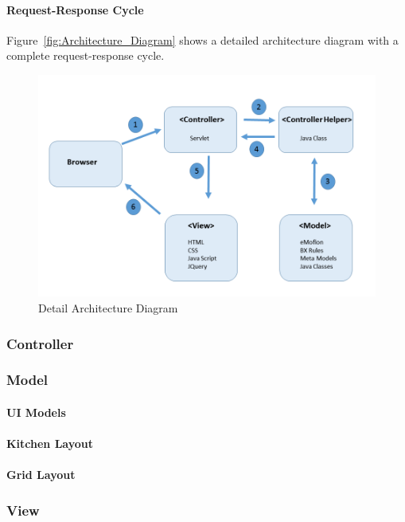 \paragraph{Request-Response Cycle} 
Figure~\ref{fig:Architecture_Diagram} shows a detailed architecture diagram with a complete request-response cycle.
\begin{figure}
	\includegraphics[width=1\textwidth]{figures/Detail_Arch}
	\caption{Detail Architecture Diagram}
	\label{fig:Detail_Architecture_Diagram}
\end{figure}

\subsubsection{Controller}\label{subsubsec:controller}

\subsubsection{Model}\label{subsubsec:model}
\paragraph{UI Models}
\paragraph{Kitchen Layout}
\paragraph{Grid Layout}

\subsubsection{View}\label{subsubsec:view}
